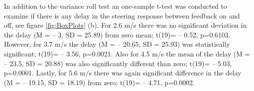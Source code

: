  In addition to the variance roll test an one-sample t-test was conducted to examine if there is any delay in the steering response between feedback on and off, see figure \ref{fig:BoxPlots} (b). For 2.6 m/s there was no significant deviation in the delay (M = -- 3, SD = 25.89) from zero mean; t(19)= -- 0.52, p=0.6103. However, for 3.7 m/s the delay (M = -- 20.65, SD = 25.93) was statistically significant; t(19)= -- 3.56, p=0.0021. Also for 4.5 m/s the mean of the delay (M = -- 23.5, SD = 20.88) was also significantly different than zero; t(19)= -- 5.03, p=0.0001. Lastly, for 5.6 m/s there was again significant difference in the delay (M = -- 19.15, SD = 18.19) from zero; t(19)= -- 4.71, p=0.0002.




